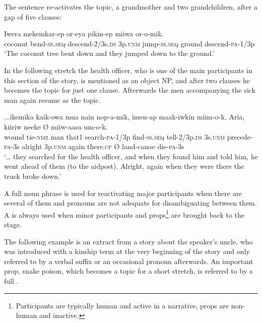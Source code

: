 The sentence  re-activates the topic, a grandmother and two grandchildren, after a gap of five clauses:

\ea%
\label{ex:9:x1923}
\gll Iwera  mekemkar-ep  or-eya    pikin-ep miiwa  or-o-mik. \\
coconut  bend-\textsc{ss}.\textsc{seq}  descend-2/3s.\textsc{ds}  3p.\textsc{unm}  jump-\textsc{ss}.\textsc{seq} ground  descend-\textsc{pa}-1/3p     \\
\glt`The coconut tree bent down and they jumped down to the ground.'
\z


In the following stretch the health officer, who is one of the main participants in this section of the story, is mentioned as an object NP, and after two clauses he becomes the topic for just one clause. Afterwards the men accompanying the sick man again resume as the topic. 

\ea%
\label{ex:9:x1924}
\gll ...ikemika  kaik-owa  mua  nain  nop-a-mik,  imen-ap maak-iwkin    miim-o-k.  Aria,    kiiriw  neeke {\O}  miiw-aasa  um-o-k.\\
wound  tie-\textsc{nmz}  man  that1  search-\textsc{pa}-1/3p  find-\textsc{ss}.\textsc{seq} tell-2/3p.\textsc{ds}  3s.\textsc{unm}  precede-\textsc{pa}-3s  alright  3p.\textsc{unm}  again  there.\textsc{cf} {\O}  land-canoe  die-\textsc{pa}-3s\\
\glt`{\dots} they searched for the health officer, and when they found him and told him, he went ahead of them (to the aidpost). Alright, again when they were there the truck broke down.'
\z


A full noun phrase is used for reactivating major participants when there are several of them and pronouns are not adequate for disambiguating between them. A  is always used when minor participants and props\footnote{Participants are typically human and active in a narrative, props are non-human and inactive. }  are brought back to the stage. 

The following example is an extract from a story about the speaker's uncle, who was introduced with a kinship term at the very beginning of the story and only referred to by a verbal suffix or an occasional pronoun afterwards. An  important prop, snake poison, which becomes a topic for a short stretch, is referred to by a full .

